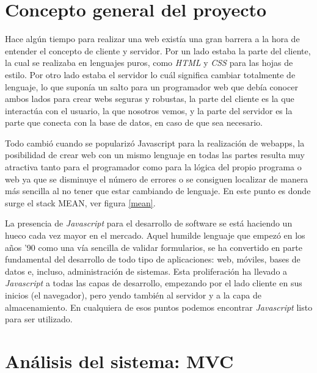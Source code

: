 \section{Concepto general del proyecto}\label{teorico-general}
Hace algún tiempo para realizar una web existía una gran barrera a la hora de entender el concepto de cliente y servidor. Por un lado estaba la parte del cliente, la cual se realizaba en lenguajes puros,  como \emph{HTML} y \emph{CSS} para las hojas de estilo. Por otro lado estaba el servidor lo cuál significa cambiar totalmente de lenguaje, lo que suponía un salto para un programador web que debía conocer ambos lados para crear webs seguras y robustas, la parte del cliente es la que interactúa con el usuario, la que nosotros vemos, y la parte del servidor es la parte que conecta con la base de datos, en caso de que sea necesario.

Todo cambió cuando se popularizó Javascript para la realización de webapps, la posibilidad de crear web con un mismo lenguaje en todas las partes resulta muy atractiva tanto para el programador como para la lógica del propio programa o web ya que se disminuye el número de errores o se consiguen localizar de manera más sencilla al no tener que estar cambiando de lenguaje. En este punto es donde surge el stack MEAN, ver figura \ref{mean}.

 \label{mean}



La presencia de \emph{Javascript} para el desarrollo de software se está haciendo un hueco cada vez mayor en el mercado. Aquel humilde lenguaje que empezó en los años '90 como una vía sencilla de validar formularios, se ha convertido en parte fundamental del desarrollo de todo tipo de aplicaciones: web, móviles, bases de datos e, incluso, administración de sistemas. Esta proliferación ha llevado a  \emph{Javascript} a todas las capas de desarrollo, empezando por el lado cliente en sus inicios (el navegador), pero yendo también al servidor y a la capa de almacenamiento. En cualquiera de esos puntos podemos encontrar  \emph{Javascript} listo para ser utilizado.







\section{Análisis del sistema: MVC}\label{analisis-sistema-mvc}

